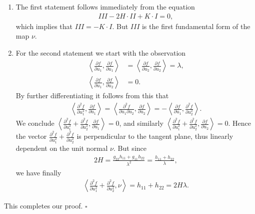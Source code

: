 \documentclass[a4paper]{article}
\numberwithin{equation}{section}
\begin{document}
\begin{enumerate}
\item The first statement follows immediately from the equation 
\begin{align}
III-2H\cdot II+K\cdot I=0,
\end{align}
which implies that $III=-K\cdot I$. But $III$ is the first fundamental form of the map $\nu$.
\item For the second statement we start with the observation
\begin{align}
\left\langle {\frac{{\partial f}}{{\partial {u_1}}},\frac{{\partial f}}{{\partial {u_1}}}} \right\rangle & = \left\langle {\frac{{\partial f}}{{\partial {u_2}}},\frac{{\partial f}}{{\partial {u_2}}}} \right\rangle  = \lambda ,\\
\left\langle {\frac{{\partial f}}{{\partial {u_1}}},\frac{{\partial f}}{{\partial {u_2}}}} \right\rangle  &= 0.
\end{align}
By further differentiating it follows from this that
\begin{align}
\left\langle {\frac{{{\partial ^2}f}}{{\partial u_1^2}},\frac{{\partial f}}{{\partial {u_1}}}} \right\rangle  = \left\langle {\frac{{{\partial ^2}f}}{{\partial {u_1}\partial {u_2}}},\frac{{\partial f}}{{\partial {u_2}}}} \right\rangle  =  - \left\langle {\frac{{\partial f}}{{\partial {u_1}}},\frac{{{\partial ^2}f}}{{\partial u_2^2}}} \right\rangle .
\end{align}
We conclude $\left\langle {\frac{{{\partial ^2}f}}{{\partial u_1^2}} + \frac{{{\partial ^2}f}}{{\partial u_2^2}},\frac{{\partial f}}{{\partial {u_1}}}} \right\rangle  = 0$, and similarly $\left\langle {\frac{{{\partial ^2}f}}{{\partial u_1^2}} + \frac{{{\partial ^2}f}}{{\partial u_2^2}},\frac{{\partial f}}{{\partial {u_2}}}} \right\rangle  = 0$. Hence the vector ${\frac{{{\partial ^2}f}}{{\partial u_1^2}} + \frac{{{\partial ^2}f}}{{\partial u_2^2}}}$ is perpendicular to the tangent plane, thus linearly dependent on the unit normal $\nu$. But since 
\begin{align}
2H = \frac{{{g_{22}}{h_{11}} + {g_{11}}{h_{22}}}}{{{\lambda ^2}}} = \frac{{{h_{11}} + {h_{22}}}}{\lambda },
\end{align}
we have finally
\begin{align}
\left\langle {\frac{{{\partial ^2}f}}{{\partial u_1^2}} + \frac{{{\partial ^2}f}}{{\partial u_2^2}},\nu } \right\rangle  = {h_{11}} + {h_{22}} = 2H\lambda .
\end{align}
\end{enumerate}
This completes our proof. \hfill $\square$\\
\end{document}
